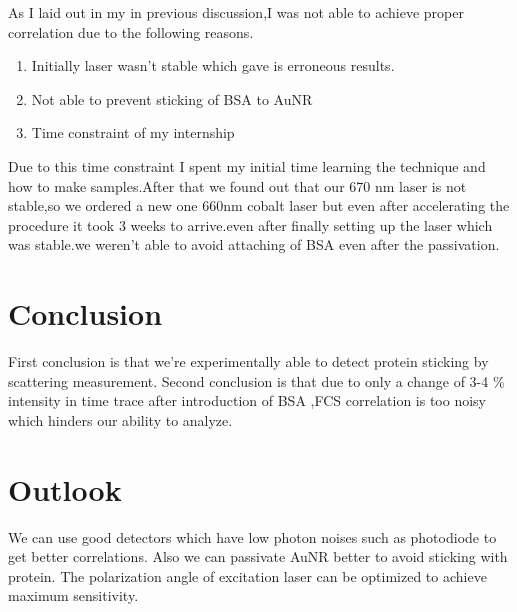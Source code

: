\documentclass[twoside,single]{lion-msc}
\begin{document}
As I laid out in my in previous discussion,I was not able to achieve proper correlation due to the following reasons.
\begin{enumerate}
\item Initially laser wasn't stable which gave is erroneous results.
\item Not able to prevent sticking of BSA to AuNR
\item Time constraint of my internship
\end{enumerate}
Due to this time constraint I spent my initial time learning the technique and how to make samples.After that we found out that our 670 nm laser is not stable,so we ordered a new one 660nm cobalt laser but even after accelerating the procedure it took 3 weeks to arrive.even after finally setting up the laser which was stable.we weren't able to avoid attaching of BSA even after the passivation.

\section{Conclusion}
First conclusion is that we're experimentally able to detect protein sticking by scattering measurement. Second conclusion is that due to only a change of 3-4 \% intensity in time trace after introduction of BSA ,FCS correlation is too noisy which hinders our ability to analyze.
 
\section{Outlook}
We can use good detectors which have low photon noises such as photodiode to get better correlations. Also we can passivate AuNR better to avoid sticking with protein. The polarization angle of excitation laser can be optimized to achieve maximum sensitivity.


\end{document}

